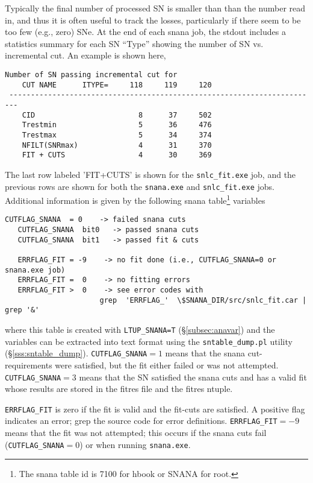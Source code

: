 \documentclass[12pt]{article}
\begin{document}
Typically the final number of processed SN
is smaller than than the number read in,
and thus it is often useful to track the losses,
particularly if there seem to be too few (e.g., zero)
SNe. At the end of each snana job, the stdout includes
a statistics summary for each SN ``Type'' showing
the number of SN vs. incremental cut. An example 
is shown here,
%
\begin{Verbatim}[frame=single] 
                          Number of SN passing incremental cut for
    CUT NAME      ITYPE=     118     119     120  
 ------------------------------------------------------------------------
    CID                        8      37     502  
    Trestmin                   5      36     476  
    Trestmax                   5      34     374  
    NFILT(SNRmax)              4      31     370  
    FIT + CUTS                 4      30     369  
\end{Verbatim}
%
The last row labeled 'FIT+CUTS' is shown 
for the {\tt snlc\_fit.exe} job,
and the previous rows are shown for both the
{\tt snana.exe} and {\tt snlc\_fit.exe} jobs.
Additional information is given by the following
snana table\footnote{The snana table id is 7100 for hbook or SNANA for root.}
variables
\begin{Verbatim}[frame=single] 
   CUTFLAG_SNANA  = 0    -> failed snana cuts
   CUTFLAG_SNANA  bit0   -> passed snana cuts
   CUTFLAG_SNANA  bit1   -> passed fit & cuts

   ERRFLAG_FIT = -9    -> no fit done (i.e., CUTFLAG_SNANA=0 or snana.exe job)
   ERRFLAG_FIT =  0    -> no fitting errors
   ERRFLAG_FIT >  0    -> see error codes with
                      grep  'ERRFLAG_'  \$SNANA_DIR/src/snlc_fit.car | grep '&'
\end{Verbatim}
%
where this table is created with {\tt LTUP\_SNANA=T}
(\S\ref{subsec:anavar}) and the variables can be
extracted into text format using the {\tt sntable\_dump.pl}
utility (\S\ref{sss:sntable_dump}).
{\tt CUTFLAG\_SNANA}$=1$ means that the snana cut-requirements
were satisfied, but the fit either failed or was not attempted.
{\tt CUTFLAG\_SNANA}$=3$ means that the SN satisfied the snana cuts
and has a valid fit whose results are stored in the fitres file
and the fitres ntuple.

{\tt ERRFLAG\_FIT} is zero if the fit is valid and the
fit-cuts are satisfied. A positive flag indicates an
error; grep the source code for error definitions.
{\tt ERRFLAG\_FIT}$=-9$ means that the fit was not
attempted; this occurs if the snana cuts fail
({\tt CUTFLAG\_SNANA}$=0$) or when running {\tt snana.exe}.
\end{document}

